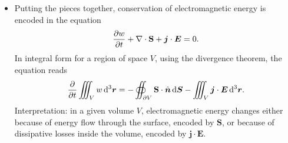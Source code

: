 \documentclass[11pt, a4paper]{article}
\newcommand{\diff}{\mathop{}\!\mathrm{d}} %
\newcommand{\dr}{\diff^{3} \r}  %
\renewcommand{\vec}[1]{\bm{#1}} %
\newcommand{\uvec}[1]{\hat{\vec{#1}}} %
\renewcommand{\r}{\vec{r}}
\newcommand{\E}{\vec{E}} %
\renewcommand{\S}{\mathbf{S}}  %
\renewcommand{\j}{\vec{j}}  %
\renewcommand{\div}{\nabla \cdot}
\begin{document}
\begin{itemize}
	\item Putting the pieces together, conservation of electromagnetic energy is encoded in the equation
	\begin{equation*}
        \pdv{w}{t} + \div \S + \j \cdot \E = 0.
	\end{equation*}
    In integral form for a region of space $ V $, using the divergence theorem, the equation reads
	\begin{equation*}
		\pdv{t}\iiint_{V}w \dr = - \oiint_{\partial V} \S \cdot \uvec{n} \diff \vec{S} - \iiint_{V} \j \cdot \E \dr.
	\end{equation*}
	Interpretation: in a given volume $ V $, electromagnetic energy changes either because of energy flow through the surface, encoded by $ \S $, or because of dissipative losses inside the volume, encoded by $ \j \cdot \E $. 
\end{itemize}
\end{document}
